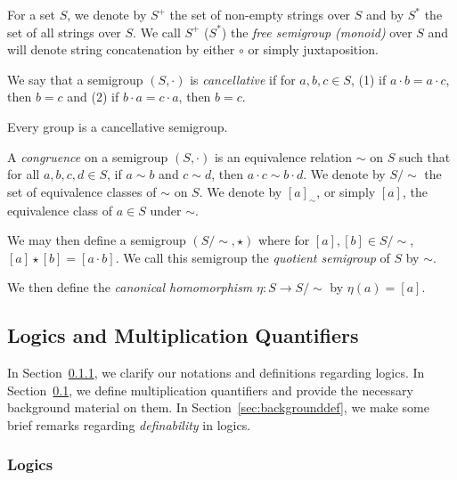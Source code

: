 \documentclass[a4paper,UKenglish,cleveref, autoref, thm-restate, anonymous]{lipics-v2021}
\begin{document}
\begin{definition}
    For a set $S$, we denote by $S^+$ the set of non-empty strings over $S$ and by $S^*$ the set of all strings over $S$. We call $S^+$ ($S^*$) the \emph{free semigroup (monoid)} over $S$ and will denote string concatenation by either $\circ$ or simply juxtaposition.
\end{definition}

\begin{definition}
    We say that a semigroup $(S, \cdot)$ is \emph{cancellative} if for $a,b,c \in S$, (1) if $a \cdot b = a \cdot c$, then $b = c$ and (2) if $b \cdot a = c \cdot a$, then $b = c$. 
\end{definition}

\begin{proposition}\label{prop:groupcanc}
    Every group is a cancellative semigroup.
\end{proposition}

\begin{definition}
    A \emph{congruence} on a semigroup $(S, \cdot)$ is an equivalence relation $\sim$ on $S$ such that for all $a,b,c,d \in S$, if $a \sim b$ and $c \sim d$, then $a \cdot c \sim b \cdot d$. We denote by $S/{\sim}$ the set of equivalence classes of $\sim$ on $S$. We denote by $[a]_{\sim}$, or simply $[a]$, the equivalence class of $a \in S$ under $\sim$.

    We may then define a semigroup $(S/{\sim}, \star)$ where for $[a],[b] \in S/{\sim}$, $[a] \star [b] = [a \cdot b]$. We call this semigroup the \emph{quotient semigroup} of $S$ by $\sim$.

    We then define the \emph{canonical homomorphism} $\eta : S \rightarrow S/{\sim}$ by $\eta(a) = [a]$.
\end{definition}

\subsection{Logics and Multiplication Quantifiers}\label{sec:backgroundmult}

In Section~\ref{sec:backgroundlogic}, we clarify our notations and definitions regarding logics. In Section~\ref{sec:backgroundmult}, we define multiplication quantifiers and provide the necessary background material on them. In Section~\ref{sec:backgrounddef}, we make some brief remarks regarding \emph{definability} in logics.

\subsubsection{Logics}\label{sec:backgroundlogic}
\end{document}
